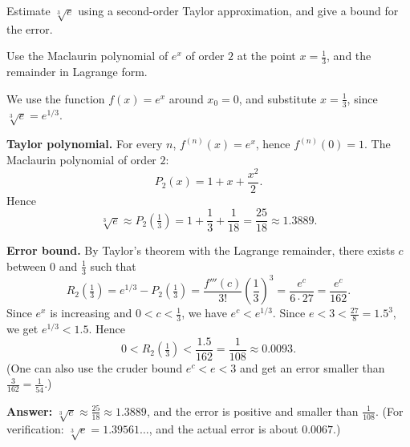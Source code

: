 
\begin{question}
Estimate $\sqrt[3]{e}$ using a second-order Taylor approximation, and give a bound for the error.
\end{question}

\begin{hint}
Use the Maclaurin polynomial of $e^x$ of order $2$ at the point $x=\frac13$, and the remainder in Lagrange form.
\end{hint}

\begin{solution}
We use the function $f(x)=e^x$ around $x_0=0$, and substitute $x=\frac13$, since $\sqrt[3]{e}=e^{1/3}$.

\textbf{Taylor polynomial.} For every $n$, $f^{(n)}(x)=e^x$, hence $f^{(n)}(0)=1$. The Maclaurin polynomial of order $2$:
\[ P_2(x)=1+x+\frac{x^2}{2}. \]
Hence
\[ \sqrt[3]{e}\approx P_2\!\left(\tfrac13\right)=1+\frac13+\frac1{18}=\frac{25}{18}\approx1.3889. \]

\textbf{Error bound.} By Taylor's theorem with the Lagrange remainder, there exists $c$ between $0$ and $\frac13$ such that
\[ R_2\!\left(\tfrac13\right)=e^{1/3}-P_2\!\left(\tfrac13\right)=\frac{f'''(c)}{3!}\left(\frac13\right)^3=\frac{e^c}{6\cdot27}=\frac{e^c}{162}. \]
Since $e^x$ is increasing and $0<c<\frac13$, we have $e^c<e^{1/3}$. Since $e<3<\frac{27}{8}=1.5^3$, we get $e^{1/3}<1.5$. Hence
\[ 0<R_2\!\left(\tfrac13\right)<\frac{1.5}{162}=\frac1{108}\approx0.0093. \]
(One can also use the cruder bound $e^c<e<3$ and get an error smaller than $\frac{3}{162}=\frac1{54}$.)

\textbf{Answer:} $\sqrt[3]{e}\approx\frac{25}{18}\approx1.3889$, and the error is positive and smaller than $\frac1{108}$. (For verification: $\sqrt[3]{e}=1.39561\ldots$, and the actual error is about $0.0067$.)
\end{solution}
